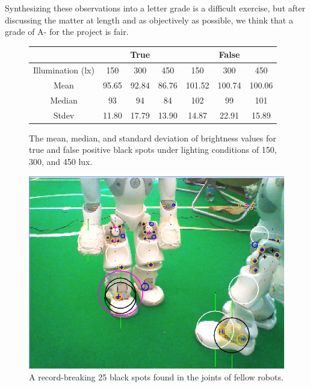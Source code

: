 \documentclass[11pt, twocolumn]{article}
\begin{document}
{\indent Synthesizing these observations into a letter grade is a difficult exercise, but after discussing the matter at length and as objectively as possible, we think that a grade of A- for the project is fair.
\onecolumn
\begin{figure}[h]
\centering
\begin{tabular}{ccccccc}
\toprule
 & \multicolumn{3}{c}{True} & \multicolumn{3}{c}{False} \\
\midrule
Illumination (lx) & 150 & 300 & 450 & 150 & 300 & 450 \\
\midrule
Mean & 95.65 & 92.84 & 86.76 & 101.52 & 100.74 & 100.06 \\
Median & 93 & 94 & 84 & 102 & 99 & 101 \\
Stdev & 11.80 & 17.79 & 13.90 & 14.87 & 22.91 & 15.89 \\
\bottomrule
\end{tabular}
\caption{The mean, median, and standard deviation of brightness values for true and false positive black spots under lighting conditions of 150, 300, and 450 lux.}
\label{fig:table}
\end{figure}

\begin{figure}[h]
\centering
\includegraphics[scale=0.5]{s4.png}
\caption{A record-breaking 25 black spots found in the joints of fellow robots.}
\label{fig:fpBlackSpots}
\end{figure}

}
\end{document}
